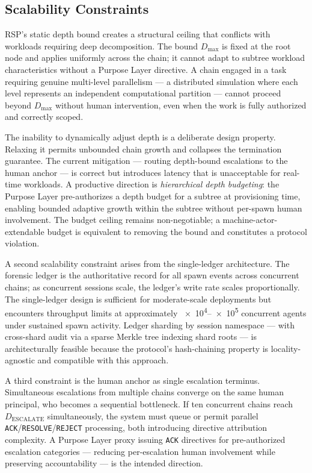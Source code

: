 \subsection{Scalability Constraints}
\label{sec:rs-scalability}

RSP's static depth bound creates a structural ceiling that conflicts with workloads requiring deep decomposition. The bound $D_{\max}$ is fixed at the root node and applies uniformly across the chain; it cannot adapt to subtree workload characteristics without a Purpose Layer directive. A chain engaged in a task requiring genuine multi-level parallelism — a distributed simulation where each level represents an independent computational partition — cannot proceed beyond $D_{\max}$ without human intervention, even when the work is fully authorized and correctly scoped.

The inability to dynamically adjust depth is a deliberate design property. Relaxing it permits unbounded chain growth and collapses the termination guarantee. The current mitigation — routing depth-bound escalations to the human anchor — is correct but introduces latency that is unacceptable for real-time workloads. A productive direction is \emph{hierarchical depth budgeting}: the Purpose Layer pre-authorizes a depth budget for a subtree at provisioning time, enabling bounded adaptive growth within the subtree without per-spawn human involvement. The budget ceiling remains non-negotiable; a machine-actor-extendable budget is equivalent to removing the bound and constitutes a protocol violation.

A second scalability constraint arises from the single-ledger architecture. The forensic ledger is the authoritative record for all spawn events across concurrent chains; as concurrent sessions scale, the ledger's write rate scales proportionally. The single-ledger design is sufficient for moderate-scale deployments but encounters throughput limits at approximately \numrange{e4}{e5} concurrent agents under sustained spawn activity. Ledger sharding by session namespace — with cross-shard audit via a sparse Merkle tree indexing shard roots — is architecturally feasible because the protocol's hash-chaining property is locality-agnostic and compatible with this approach.

A third constraint is the human anchor as single escalation terminus. Simultaneous escalations from multiple chains converge on the same human principal, who becomes a sequential bottleneck. If ten concurrent chains reach $D_{\text{ESCALATE}}$ simultaneously, the system must queue or permit parallel \texttt{ACK}/\texttt{RESOLVE}/\texttt{REJECT} processing, both introducing directive attribution complexity. A Purpose Layer proxy issuing \texttt{ACK} directives for pre-authorized escalation categories — reducing per-escalation human involvement while preserving accountability — is the intended direction.

